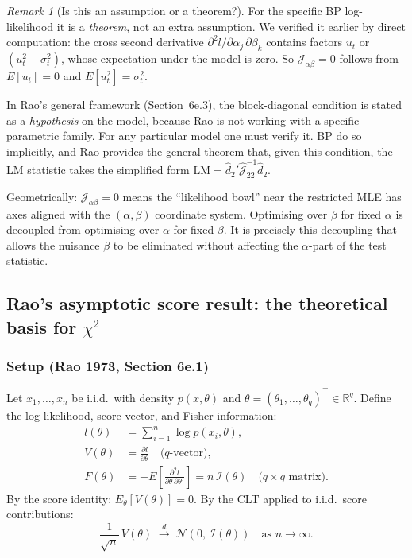 \documentclass[a4paper,oneside,12pt]{extarticle}
\theoremstyle{plain}
\theoremstyle{definition}
\theoremstyle{remark}
\newtheorem{remark}[proposition]{Remark}
\begin{document}
\begin{remark}[Is this an assumption or a theorem?]
For the specific BP log-likelihood it is a \emph{theorem}, not
an extra assumption.  We verified it earlier by direct
computation: the cross second derivative
$\partial^2 l/\partial\alpha_j\,\partial\beta_k$ contains
factors $u_t$ or $(u_t^2 - \sigma_t^2)$, whose expectation
under the model is zero.  So $\mathcal{J}_{\alpha\beta} = 0$
follows from $E[u_t] = 0$ and $E[u_t^2] = \sigma_t^2$.

In Rao's general framework (Section~6e.3), the block-diagonal
condition is stated as a \emph{hypothesis} on the model,
because Rao is not working with a specific parametric family.
For any particular model one must verify it.  BP do so
implicitly, and Rao provides the general theorem that, given
this condition, the LM statistic takes the simplified form
$\mathrm{LM} = \hat{d}_2'\hat{\mathcal{J}}_{22}^{-1}\hat{d}_2$.

Geometrically: $\mathcal{J}_{\alpha\beta} = 0$ means the
``likelihood bowl'' near the restricted MLE has axes aligned
with the $(\alpha,\beta)$ coordinate system.  Optimising over
$\beta$ for fixed $\alpha$ is decoupled from optimising over
$\alpha$ for fixed $\beta$.  It is precisely this decoupling
that allows the nuisance $\beta$ to be eliminated without
affecting the $\alpha$-part of the test statistic.
\end{remark}


\subsection{Rao's asymptotic score result: the theoretical basis for \texorpdfstring{$\chi^2$}{chi-squared}}
\label{subsec:rao-score}

\subsubsection*{Setup (Rao 1973, Section 6e.1)}

Let $x_1,\ldots,x_n$ be i.i.d.\ with density $p(x,\theta)$ and
$\theta = (\theta_1,\ldots,\theta_q)^\top \in \mathbb{R}^q$.  Define the
log-likelihood, score vector, and Fisher information:
\begin{align*}
  l(\theta) &= \sum_{i=1}^n \log p(x_i,\theta), \\
  V(\theta) &= \frac{\partial l}{\partial\theta}
  \quad \text{($q$-vector)}, \\
  F(\theta) &= -E\!\left[\frac{\partial^2 l}{\partial\theta\,
    \partial\theta'}\right]
  = n\,\mathcal{I}(\theta)
  \quad \text{($q\times q$ matrix)}.
\end{align*}
By the score identity: $E_\theta[V(\theta)] = 0$.  By the CLT
applied to i.i.d.\ score contributions:
\[
  \frac{1}{\sqrt{n}}\,V(\theta)
  \;\xrightarrow{d}\; \mathcal{N}(0,\, \mathcal{I}(\theta))
  \quad \text{as } n\to\infty.
\]
\end{document}
